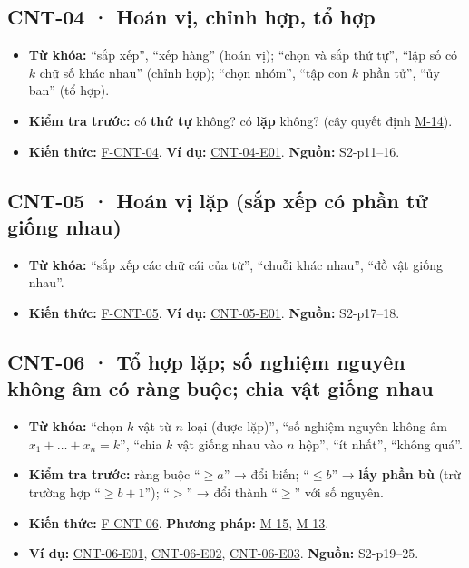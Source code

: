 \documentclass[
  10pt,
  twoside,openany]{book}
\providecommand{\tightlist}{%
  \setlength{\itemsep}{0pt}\setlength{\parskip}{0pt}}
\begin{document}
\hypertarget{CNT-04}{%
\subsection{CNT-04 · Hoán vị, chỉnh hợp, tổ hợp}\label{CNT-04}}

\begin{itemize}
\tightlist
\item
  \textbf{Từ khóa:} ``sắp xếp'', ``xếp hàng'' (hoán vị); ``chọn và sắp
  thứ tự'', ``lập số có \(k\) chữ số khác nhau'' (chỉnh hợp); ``chọn
  nhóm'', ``tập con \(k\) phần tử'', ``ủy ban'' (tổ hợp).
\item
  \textbf{Kiểm tra trước:} có \textbf{thứ tự} không? có \textbf{lặp}
  không? (cây quyết định \protect\hyperlink{M-14}{M-14}).
\item
  \textbf{Kiến thức:} \protect\hyperlink{F-CNT-04}{F-CNT-04}. \textbf{Ví
  dụ:} \protect\hyperlink{CNT-04-E01}{CNT-04-E01}. \textbf{Nguồn:}
  S2-p11--16.
\end{itemize}

\hypertarget{CNT-05}{%
\subsection{CNT-05 · Hoán vị lặp (sắp xếp có phần tử giống
nhau)}\label{CNT-05}}

\begin{itemize}
\tightlist
\item
  \textbf{Từ khóa:} ``sắp xếp các chữ cái của từ'', ``chuỗi khác nhau'',
  ``đồ vật giống nhau''.
\item
  \textbf{Kiến thức:} \protect\hyperlink{F-CNT-05}{F-CNT-05}. \textbf{Ví
  dụ:} \protect\hyperlink{CNT-05-E01}{CNT-05-E01}. \textbf{Nguồn:}
  S2-p17--18.
\end{itemize}

\hypertarget{CNT-06}{%
\subsection{CNT-06 · Tổ hợp lặp; số nghiệm nguyên không âm có ràng buộc;
chia vật giống nhau}\label{CNT-06}}

\begin{itemize}
\tightlist
\item
  \textbf{Từ khóa:} ``chọn \(k\) vật từ \(n\) loại (được lặp)'', ``số
  nghiệm nguyên không âm \(x_1+\dots+x_n=k\)'', ``chia \(k\) vật giống
  nhau vào \(n\) hộp'', ``ít nhất'', ``không quá''.
\item
  \textbf{Kiểm tra trước:} ràng buộc ``\(\ge a\)'' → đổi biến;
  ``\(\le b\)'' → \textbf{lấy phần bù} (trừ trường hợp ``\(\ge b+1\)'');
  ``\(>\)'' → đổi thành ``\(\ge\)'' với số nguyên.
\item
  \textbf{Kiến thức:} \protect\hyperlink{F-CNT-06}{F-CNT-06}.
  \textbf{Phương pháp:} \protect\hyperlink{M-15}{M-15},
  \protect\hyperlink{M-13}{M-13}.
\item
  \textbf{Ví dụ:} \protect\hyperlink{CNT-06-E01}{CNT-06-E01},
  \protect\hyperlink{CNT-06-E02}{CNT-06-E02},
  \protect\hyperlink{CNT-06-E03}{CNT-06-E03}. \textbf{Nguồn:}
  S2-p19--25.
\end{itemize}
\end{document}
